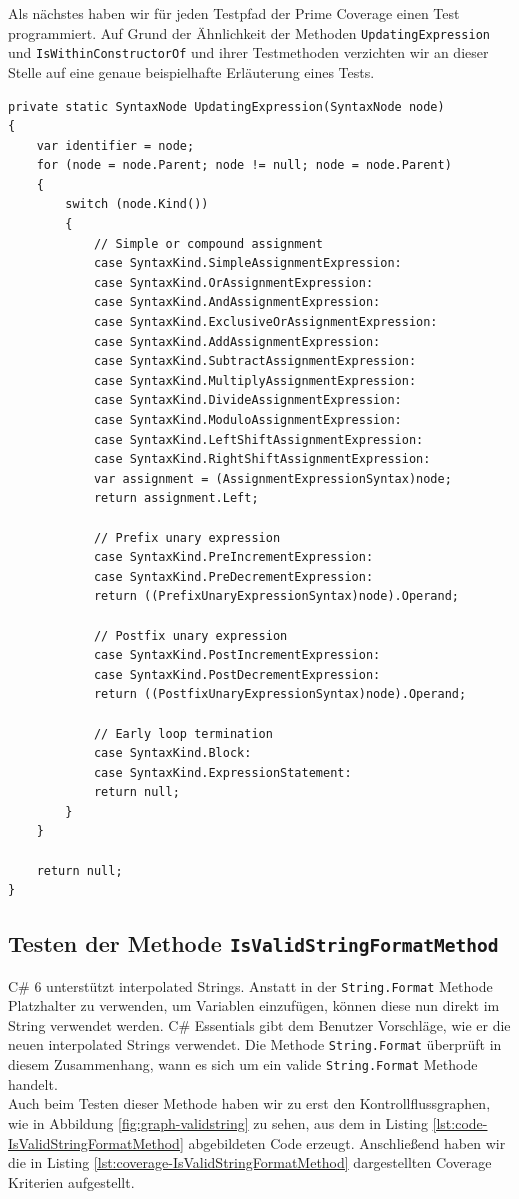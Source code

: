 Als nächstes haben wir für jeden Testpfad der Prime Coverage einen Test programmiert. Auf Grund der Ähnlichkeit der Methoden \texttt{UpdatingExpression} und \texttt{IsWithinConstructorOf} und ihrer Testmethoden verzichten wir an dieser Stelle auf eine genaue beispielhafte Erläuterung eines Tests.\newpage
\begin{lstlisting}[caption={Mehtode \texttt{UpdatingExpression}},
label=lst:code-UpdatingExpression]
private static SyntaxNode UpdatingExpression(SyntaxNode node)
{
	var identifier = node;
 	for (node = node.Parent; node != null; node = node.Parent)
 	{
 		switch (node.Kind())
 		{
 			// Simple or compound assignment
 			case SyntaxKind.SimpleAssignmentExpression:
 			case SyntaxKind.OrAssignmentExpression:
 			case SyntaxKind.AndAssignmentExpression:
 			case SyntaxKind.ExclusiveOrAssignmentExpression:
 			case SyntaxKind.AddAssignmentExpression:
 			case SyntaxKind.SubtractAssignmentExpression:
 			case SyntaxKind.MultiplyAssignmentExpression:
 			case SyntaxKind.DivideAssignmentExpression:
 			case SyntaxKind.ModuloAssignmentExpression:
 			case SyntaxKind.LeftShiftAssignmentExpression:
 			case SyntaxKind.RightShiftAssignmentExpression:
 			var assignment = (AssignmentExpressionSyntax)node;
 			return assignment.Left;
 			
 			// Prefix unary expression
 			case SyntaxKind.PreIncrementExpression:
 			case SyntaxKind.PreDecrementExpression:
 			return ((PrefixUnaryExpressionSyntax)node).Operand;
 			
 			// Postfix unary expression
 			case SyntaxKind.PostIncrementExpression:
 			case SyntaxKind.PostDecrementExpression:
 			return ((PostfixUnaryExpressionSyntax)node).Operand;
 			
 			// Early loop termination
 			case SyntaxKind.Block:
 			case SyntaxKind.ExpressionStatement:
 			return null;
 		}
 	}
 	
	return null;
}
\end{lstlisting}
\subsection{Testen der Methode \texttt{IsValidStringFormatMethod}}
C\# 6 unterstützt interpolated Strings. Anstatt in der \texttt{String.Format} Methode Platzhalter zu verwenden, um Variablen einzufügen, können diese nun direkt im String verwendet werden.\cite{csharp6} C\# Essentials gibt dem Benutzer Vorschläge, wie er die neuen interpolated Strings verwendet. Die Methode \texttt{String.Format} überprüft in diesem Zusammenhang, wann es sich um ein valide \texttt{String.Format} Methode handelt.\\
Auch beim Testen dieser Methode haben wir zu erst den Kontrollflussgraphen, wie in Abbildung \ref{fig:graph-validstring} zu sehen, aus dem in Listing \ref{lst:code-IsValidStringFormatMethod} abgebildeten Code erzeugt. Anschließend haben wir die in Listing \ref{lst:coverage-IsValidStringFormatMethod} dargestellten Coverage Kriterien aufgestellt.


